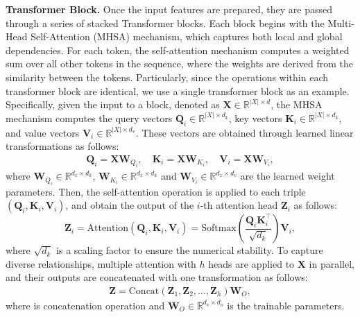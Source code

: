 \noindent \textbf{Transformer Block.}
Once the input features are prepared, they are passed through a series of stacked Transformer blocks. Each block begins with the Multi-Head Self-Attention (MHSA) mechanism, which captures both local and global dependencies. For each token, the self-attention mechanism computes a weighted sum over all other tokens in the sequence, where the weights are derived from the similarity between the tokens.
Particularly, since the operations within each transformer block are identical, we use a single transformer block as an example.
Specifically, given the input to a block, denoted as $\mathbf{X} \in \mathbb{R}^{|X| \times d}$, the MHSA mechanism computes the query vectors $\mathbf{Q}_i \in \mathbb{R}^{|X| \times d_k}$, key vectors $\mathbf{K}_i \in \mathbb{R}^{|X| \times d_k}$, and value vectors $\mathbf{V}_i \in \mathbb{R}^{|X| \times d_v}$. These vectors are obtained through learned linear transformations as follows:
\begin{align}\label{eq:qkv}
\mathbf{Q}_i = \mathbf{X}\mathbf{W}_{Q_i}, \quad
\mathbf{K}_i = \mathbf{X}\mathbf{W}_{K_i}, \quad
\mathbf{V}_i = \mathbf{X}\mathbf{W}_{V_i},
\end{align}
where $\mathbf{W}_{Q_i}\in \mathbb{R}^{d_x \times d_k}$, $\mathbf{W}_{K_i} \in \mathbb{R}^{d_x \times d_k}$
and $\mathbf{W}_{V_i} \in \mathbb{R}^{d_x \times d_v}$ are the learned weight parameters.
Then, the self-attention operation is applied to each triple $(\mathbf{Q}_i, \mathbf{K}_i, \mathbf{V}_i)$, and obtain  the output of the $i$-th attention head $\mathbf{Z}_i$ as follows:
\begin{equation}\label{eq:self_attention}
\mathbf{Z}_i = \text{Attention}(\mathbf{Q}_i, \mathbf{K}_i, \mathbf{V}_i) = \text{Softmax}\left(\frac{\mathbf{Q}_i \mathbf{K}_i^\top}{\sqrt{d_k}}\right) \mathbf{V}_i,
\end{equation}
where  $\sqrt{d_k}$  is a scaling factor to ensure the numerical stability. To capture diverse relationships, multiple attention with $h$ heads are applied to $\mathbf{X}$ in parallel, and their outputs are concatenated with one transformation as follows:
\begin{align}\label{eq:self_attention_concat}
\mathbf{Z}=\text{Concat}(\mathbf{Z}_1, \mathbf{Z}_2, \dots, \mathbf{Z}_h)\mathbf{W}_O,
\end{align}
where  is concatenation operation and $\mathbf{W}_O \in \mathbb{R}^{d_v \times d_o}$ is the trainable parameters.




